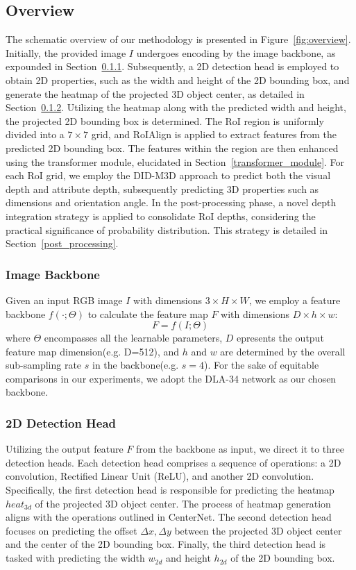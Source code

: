 \documentclass{article}
\begin{document}
\subsection{Overview}
The schematic overview of our methodology is presented in Figure~\ref{fig:overview}. Initially, the provided image $I$ undergoes encoding by the image backbone, as expounded in Section~\ref{backbone}. Subsequently, a 2D detection head is employed to obtain 2D properties, such as the width and height of the 2D bounding box, and generate the heatmap of the projected 3D object center, as detailed in Section~\ref{2d_detection_head}. Utilizing the heatmap along with the predicted width and height, the projected 2D bounding box is determined. The RoI region is uniformly divided into a $7\times 7$ grid, and RoIAlign is applied to extract features from the predicted 2D bounding box. The features within the region are then enhanced using the transformer module, elucidated in Section~\ref{transformer_module}. For each RoI grid, we employ the DID-M3D approach to predict both the visual depth and attribute depth, subsequently predicting 3D properties such as dimensions and orientation angle. In the post-processing phase, a novel depth integration strategy is applied to consolidate RoI depths, considering the practical significance of probability distribution. This strategy is detailed in Section~\ref{post_processing}.
\subsubsection{Image Backbone}\label{backbone}
Given an input RGB image $I$ with dimensions $3\times H \times W$, we employ a feature backbone $f(\cdot; \Theta)$ to calculate the feature map $F$ with dimensions $D\times h \times w$:
\begin{equation}
	F = f(I;\Theta)
\label{eq:backbone}
\end{equation}
where $\Theta$ encompasses all the learnable parameters, $D$ epresents the output feature map dimension(e.g. D=512), and $h$ and $w$ are determined by the overall sub-sampling rate $s$ in the backbone(e.g. $s=4$). For the sake of equitable comparisons in our experiments, we adopt the DLA-34 network as our chosen backbone.
\subsubsection{2D Detection Head}\label{2d_detection_head}
Utilizing the output feature $F$ from the backbone as input, we direct it to three detection heads. Each detection head comprises a sequence of operations: a 2D convolution, Rectified Linear Unit (ReLU), and another 2D convolution. Specifically, the first detection head is responsible for predicting the heatmap $heat_{3d}$ of the projected 3D object center. The process of heatmap generation aligns with the operations outlined in CenterNet. The second detection head focuses on predicting the offset $\Delta x, \Delta y$ between the projected 3D object center and the center of the 2D bounding box. Finally, the third detection head is tasked with predicting the width $w_{2d}$ and height $h_{2d}$ of the 2D bounding box. 
\end{document}
